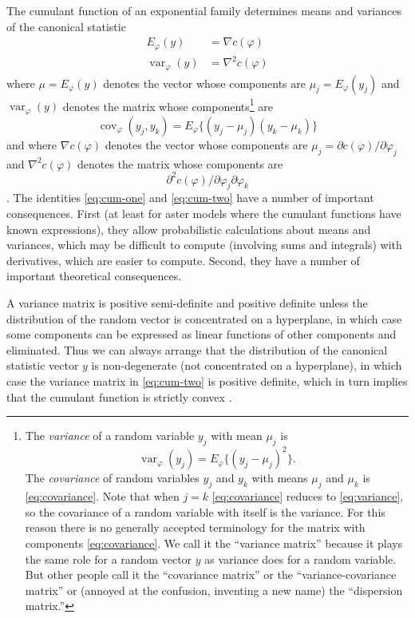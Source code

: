 \documentclass[11pt]{article}
\DeclareMathOperator{\var}{var}
\DeclareMathOperator{\cov}{cov}
\begin{document}
The cumulant function of an exponential family determines means and variances
of the canonical statistic
\begin{subequations}
\begin{align}
   E_\varphi(y) & = \nabla c(\varphi)
   \label{eq:cum-one}
   \\
   \var_\varphi(y) & = \nabla^2 c(\varphi)
   \label{eq:cum-two}
\end{align}
\end{subequations}
where $\mu = E_\varphi(y)$ denotes the vector
whose components are $\mu_j = E_\varphi(y_j)$ and $\var_\varphi(y)$ denotes
the matrix whose components\footnote{The \emph{variance} of a random variable
$y_j$ with mean $\mu_j$ is
\begin{equation} \label{eq:variance}
   \var_\varphi(y_j) = E_\varphi\{ (y_j - \mu_j)^2 \}.
\end{equation}
The \emph{covariance} of random variables $y_j$ and $y_k$ with means $\mu_j$
and $\mu_k$ is \eqref{eq:covariance}.  Note that when $j = k$
\eqref{eq:covariance} reduces to \eqref{eq:variance}, so the covariance of
a random variable with itself is the variance.  For this reason there is no
generally accepted terminology for the matrix with components
\eqref{eq:covariance}.  We call it the ``variance matrix'' because it plays
the same role for a random vector $y$ as variance does for a random variable.
But other people call it the ``covariance matrix'' or the ``variance-covariance
matrix'' or (annoyed at the confusion, inventing a new name) the ``dispersion
matrix.''}
are
\begin{equation} \label{eq:covariance}
   \cov_\varphi(y_j, y_k) = E_\varphi\{ (y_j - \mu_j) (y_k - \mu_k) \}
\end{equation}
and where $\nabla c(\varphi)$ denotes the vector
whose components are $\mu_j = \partial c(\varphi) / \partial \varphi_j$
and $\nabla^2 c(\varphi)$ denotes the matrix whose components
are
$$
   \partial^2 c(\varphi) / \partial \varphi_j \partial \varphi_k
$$
\citep[Theorem~8.1]{barndorff}.  The identities \eqref{eq:cum-one}
and \eqref{eq:cum-two} have a number of important consequences.  First
(at least for aster models where the cumulant functions have known expressions),
they allow probabilistic calculations about means and variances, which may
be difficult to compute (involving sums and integrals) with derivatives,
which are easier to compute.
Second, they have a number of important theoretical consequences.

A variance matrix is positive semi-definite and positive definite unless
the distribution of the random vector is concentrated on
a hyperplane, in which case some components can be expressed as linear
functions of other components and eliminated.  Thus we can always arrange
that the distribution of the canonical statistic vector $y$ is non-degenerate
(not concentrated on a hyperplane), in which case the variance matrix in
\eqref{eq:cum-two} is positive definite, which in turn implies that the
cumulant function is strictly convex \citep[Theorem~2.14]{raw}.
\end{document}
